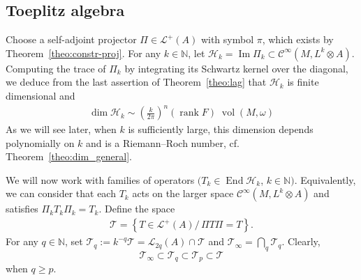 \documentclass[10pt,a4paper]{article}
\theoremstyle{definition}
\numberwithin{equation}{section}
\newcommand{\N}{{\mathbb{N}}}
\newcommand{\om}{{\omega}}
\newcommand{\op}{\operatorname}
\newcommand{\Ci}{{\mathcal{C}}^{\infty}}
\newcommand{\lag}{\mathcal{L}}
\newcommand{\Hilb}{\mathcal{H}}
\newcommand{\clT}{\mathcal{T}}
\begin{document}
\subsection{Toeplitz algebra} \label{sec:toeplitz-algebra}

Choose a self-adjoint projector $\Pi \in \lag ^+ (A)$ with symbol $\pi$, which exists by Theorem~\ref{theo:constr-proj}. For any $k\in \N$, let $\Hilb_k = \op{Im} \Pi_k \subset \Ci (M, L^k \otimes A)$. Computing the trace of $\Pi_k$ by integrating its Schwartz kernel over the diagonal, we deduce from the last assertion of Theorem~\ref{theo:lag} that $\Hilb_k$ is finite dimensional and 
\begin{gather}\label{eq:estim_dim}
\op{dim} \Hilb_k \sim \left(\frac{k}{2 \pi} \right)^n (\op{rank} F) \;
\op{vol} (M, \om)
\end{gather}
As we will see later, when $k$ is sufficiently large, this dimension depends polynomially on $k$ and is a Riemann--Roch number, cf. Theorem~\ref{theo:dim_general}. 

We will now work with families of operators $(T_k \in \op{End} \Hilb_k$, $k \in
\N)$. Equivalently, we can consider that each $T_k$ acts on the larger space $\Ci (M, L^k \otimes A)$ and satisfies $\Pi_k T_k \Pi_k = T_k$. Define the space
\begin{gather}\label{eq:Toeplitz_Pi}
\clT = \left\{ T \in \lag^{+} (A) / \, \Pi T \Pi = T \right\}.
\end{gather}
For any $q \in \N$, set $\clT_q := k^{-q} \clT =
\lag_{2q} (A) \cap \clT $ and $\clT_{\infty} = \bigcap_q \clT_q $. Clearly,
\[
\clT_\infty
\subset \clT_q
\subset \clT_p \subset \clT
\]
when $q \geqslant p$.
\end{document}
